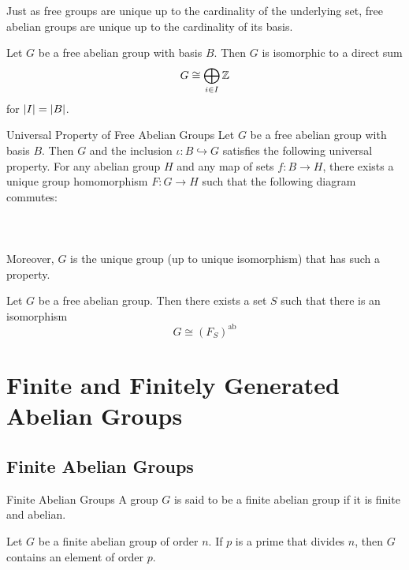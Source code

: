 \documentclass[a4paper]{article}
\begin{document}
Just as free groups are unique up to the cardinality of the underlying set, free abelian groups are unique up to the cardinality of its basis. 

\begin{prp}{}{} Let $G$ be a free abelian group with basis $B$. Then $G$ is isomorphic to a direct sum $$G\cong\bigoplus_{i\in I}\mathbb{Z}$$ for $\abs{I}=\abs{B}$. 
\end{prp}

\begin{prp}{Universal Property of Free Abelian Groups}{} Let $G$ be a free abelian group with basis $B$. Then $G$ and the inclusion $\iota:B\hookrightarrow G$ satisfies the following universal property. For any abelian group $H$ and any map of sets $f:B\to H$, there exists a unique group homomorphism $F:G\to H$ such that the following diagram commutes: \\~\\
 \\~\\
Moreover, $G$ is the unique group (up to unique isomorphism) that has such a property. 
\end{prp}

\begin{prp}{}{} Let $G$ be a free abelian group. Then there exists a set $S$ such that there is an isomorphism $$G\cong(F_S)^\text{ab}$$
\end{prp}

\pagebreak
\section{Finite and Finitely Generated Abelian Groups}
\subsection{Finite Abelian Groups}
\begin{defn}{Finite Abelian Groups}{} A group $G$ is said to be a finite abelian group if it is finite and abelian. 
\end{defn}

\begin{lmm}{}{} Let $G$ be a finite abelian group of order $n$. If $p$ is a prime that divides $n$, then $G$ contains an element of order $p$. 
\end{lmm}
\end{document}
